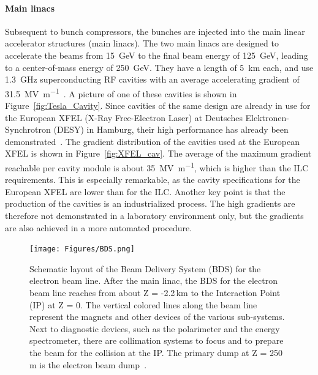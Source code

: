 \paragraph{Main linacs}
Subsequent to bunch compressors, the bunches are injected into the main linear accelerator structures (main linacs).
The two main linacs are designed to accelerate the beams from \SI{15}{\GeV} to the final beam energy of \SI{125}{\GeV}, leading to a center-of-mass energy of \SI{250}{\GeV}.
They have a length of \SI{5}{\kilo\meter} each, and use \SI{1.3}{\giga\hertz} superconducting RF cavities with an average accelerating gradient of \SI{31.5}{\mega\volt\per\meter}~\cite{Walker}.
A picture of one of these cavities is shown in Figure~\ref{fig:Tesla_Cavity}. 
Since cavities of the same design are already in use for the European XFEL (X-Ray Free-Electron Laser) at Deutsches Elektronen-Synchrotron (DESY) in Hamburg, their high performance has already been demonstrated~\cite{XFEL}.
The gradient distribution of the cavities used at the European XFEL is shown in Figure~\ref{fig:XFEL_cav}.
The average of the maximum gradient reachable per cavity module is about \SI{35}{\mega\volt\per\meter}, which is higher than the ILC requirements.
This is especially remarkable, as the cavity specifications for the European XFEL are lower than for the ILC.
Another key point is that the production of the cavities is an industrialized process.
The high gradients are therefore not demonstrated in a laboratory environment only, but the gradients are also achieved in a more automated procedure.

\begin{figure}[h!]
\centering
\texttt{[image: Figures/BDS.png]}
\caption[Layout of the Beam Delivery System]{Schematic layout of the Beam Delivery System (BDS) for the electron beam line.
After the main linac, the BDS for the electron beam line reaches from about Z = -2.2\,km to the Interaction Point (IP) at Z = 0.
The vertical colored lines along the beam line represent the magnets and other devices of the various sub-systems.
Next to diagnostic devices, such as the polarimeter and the energy spectrometer, there are collimation systems to focus and to prepare the beam for the collision at the IP.
The primary dump at Z = 250\,m is the electron beam dump~\cite[p. 135]{TDR32}.}
\label{fig:BDS}
\end{figure}

